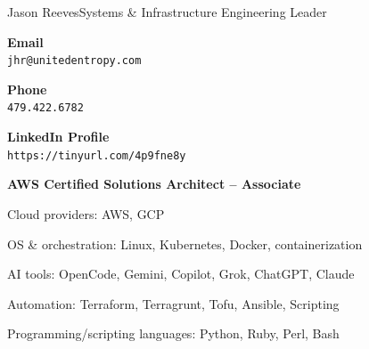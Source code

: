 \documentclass{article}
\begin{document}
\raggedbottom
\renewcommand\cvavatarradius{0}
\renewcommand\cvavatarborderwidth{0}
\renewcommand\cvheaderoffset{10}
\begin{cv}{Jason Reeves}{Systems \& Infrastructure Engineering Leader}
\cvsidebar %



\begin{cvitem}[Envelope][4]
    \textbf{Email}\\
    \texttt{jhr@unitedentropy.com}
\end{cvitem}

\cvseparator[3]
\begin{cvitem}[Phone][4]
    \textbf{Phone}\\
    \texttt{479.422.6782}
\end{cvitem}

\cvseparator[3]
\begin{cvitem}[Globe][4]
    \textbf{LinkedIn Profile}\\
    \texttt{https://tinyurl.com/4p9fne8y}
\end{cvitem}


\begin{cvitem}
  \footnotesize \textbf{AWS Certified Solutions Architect -- Associate}
\end{cvitem}

\cvseparator
\begin{cvitem}
  \footnotesize Cloud providers: AWS, GCP
\end{cvitem}

\cvseparator
\begin{cvitem}
  \footnotesize OS \& orchestration: Linux, Kubernetes, Docker, containerization
\end{cvitem}

\cvseparator
\begin{cvitem}
  \footnotesize AI tools: OpenCode, Gemini, Copilot, Grok, ChatGPT, Claude
\end{cvitem}

\cvseparator
\begin{cvitem}
  \footnotesize Automation: Terraform, Terragrunt, Tofu, Ansible, Scripting
\end{cvitem}

\cvseparator
\begin{cvitem}
  \footnotesize Programming/scripting languages: Python, Ruby, Perl, Bash
\end{cvitem}


\end{cv}
\end{document}
